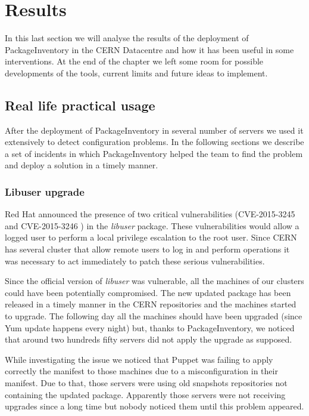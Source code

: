 \section{Results}

In this last section we will analyse the results of the deployment of
PackageInventory in the CERN Datacentre and how it has been useful in some
interventions. At the end of the chapter we left some room for possible
developments of the tools, current limits and future ideas to implement.

\subsection{Real life practical usage}

After the deployment of PackageInventory in several number of servers we
used it extensively to detect configuration problems. In the following
sections we describe a set of incidents in which PackageInventory helped
the team to find the problem and deploy a solution in a timely manner.

  \subsubsection{Libuser upgrade}

  Red Hat announced the presence of two critical vulnerabilities
  (CVE-2015-3245 \cite{cve-2015-3245} and CVE-2015-3246
  \cite{cve-2015-3246}) in the \textit{libuser} package. These
  vulnerabilities would allow a logged user to perform a local privilege
  escalation to the root user. Since CERN has several cluster that allow
  remote users to log in and perform operations it was necessary to act
  immediately to patch these serious vulnerabilities.

  Since the official version of \textit{libuser} was vulnerable, all the
  machines of our clusters could have been potentially compromised. The
  new updated package has been released in a timely manner in the CERN
  repositories and the machines started to upgrade. The following day all
  the machines should have been upgraded (since Yum update happens every
  night) but, thanks to PackageInventory, we noticed that around two
  hundreds fifty servers did not apply the upgrade as supposed.

  While investigating the issue we noticed that Puppet was failing to
  apply correctly the manifest to those machines due to a misconfiguration
  in their manifest. Due to that, those servers were using old snapshots
  repositories not containing the updated package. Apparently those
  servers were not receiving upgrades since a long time but nobody noticed
  them until this problem appeared.

